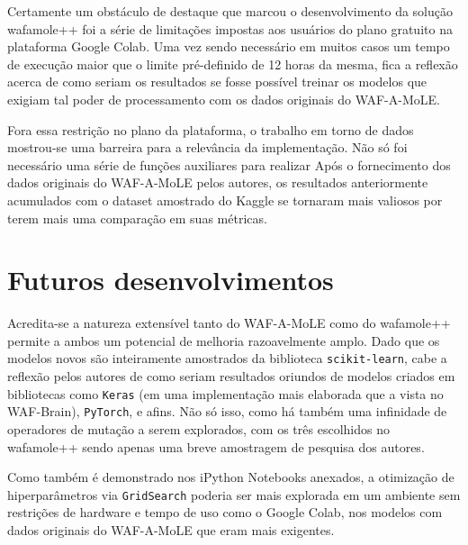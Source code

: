 Certamente um obstáculo de destaque que marcou o desenvolvimento da solução wafamole++ foi a série de limitações impostas aos usuários do plano gratuito na plataforma Google Colab. Uma vez sendo necessário em muitos casos um tempo de execução maior que o limite pré-definido de 12 horas da mesma, fica a reflexão acerca de como seriam os resultados se fosse possível treinar os modelos que exigiam tal poder de processamento com os dados originais do WAF-A-MoLE.

Fora essa restrição no plano da plataforma, o trabalho em torno de dados mostrou-se uma barreira para a relevância da implementação. Não só foi necessário uma série de funções auxiliares para realizar Após o fornecimento dos dados originais do WAF-A-MoLE pelos autores, os resultados anteriormente acumulados com o dataset amostrado do Kaggle se tornaram mais valiosos por terem mais uma comparação em suas métricas.

\section{Futuros desenvolvimentos}
Acredita-se a natureza extensível tanto do WAF-A-MoLE como do wafamole++ permite a ambos um potencial de melhoria razoavelmente amplo. Dado que os modelos novos são inteiramente amostrados da biblioteca \verb+scikit-learn+, cabe a reflexão pelos autores de como seriam resultados oriundos de modelos criados em bibliotecas como \verb+Keras+ (em uma implementação mais elaborada que a vista no WAF-Brain), \verb+PyTorch+, e afins. Não só isso, como há também uma infinidade de operadores de mutação a serem explorados, com os três escolhidos no wafamole++ sendo apenas uma breve amostragem de pesquisa dos autores.

Como também é demonstrado nos iPython Notebooks anexados, a otimização de hiperparâmetros via \verb+GridSearch+ poderia ser mais explorada em um ambiente sem restrições de hardware e tempo de uso como o Google Colab, nos modelos com dados originais do WAF-A-MoLE que eram mais exigentes. 
